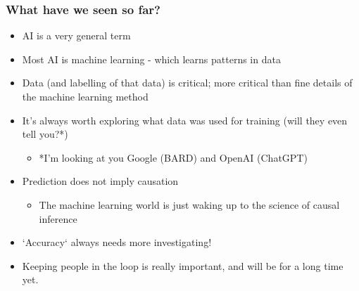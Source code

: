 \begin{frame}
\frametitle{What have we seen so far?}
\begin{itemize}
    \setlength{\itemsep}{2mm}
    \item AI is a very general term
    \item Most AI is machine learning - which learns patterns in data
    \item Data (and labelling of that data) is critical; more critical than fine details of the machine learning method
    \item It's always worth exploring what data was used for training (will they even tell you?*)  
    \begin{itemize}
        \item *I'm looking at you Google (BARD) and OpenAI (ChatGPT)
    \end{itemize}
    \item Prediction does not imply causation
    \begin{itemize}
        \item The machine learning world is just waking up to the science of causal inference
    \end{itemize}
    \item `Accuracy` always needs more investigating!
    \item Keeping people in the loop is really important, and will be for a long time yet.
\end{itemize}

\end{frame}